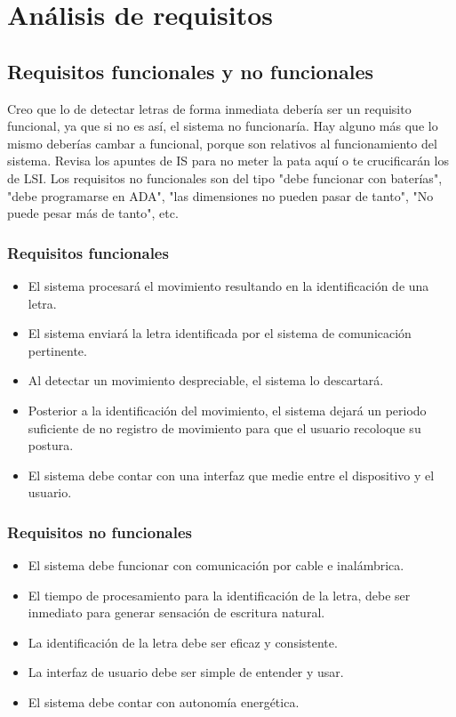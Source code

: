 \chapter{Análisis de requisitos}

\section{Requisitos funcionales y no funcionales}
{\color{red}Creo que lo de detectar letras de forma inmediata debería
ser un requisito funcional, ya que si no es así, el sistema no
funcionaría. Hay alguno más que lo mismo deberías cambar a
funcional, porque son relativos al funcionamiento del sistema. Revisa
los apuntes de IS para no meter la pata aquí o te crucificarán los
de LSI. Los requisitos no funcionales son del tipo "debe funcionar con
baterías", "debe programarse en ADA", "las dimensiones no pueden
pasar de tanto", "No puede pesar más de tanto", etc.}
\subsection{Requisitos funcionales}
\begin{itemize}
    \itemsep0em 
    \item El sistema procesará el movimiento resultando en la
    identificación de una letra.
    \item El sistema enviará la letra identificada por el sistema
    de comunicación pertinente.
    \item Al detectar un movimiento despreciable, el sistema lo descartará.
    \item Posterior a la identificación del movimiento, el sistema
    dejará un periodo suficiente de no registro de movimiento para
    que el usuario recoloque su postura.
    \item El sistema debe contar con una interfaz que medie entre
    el dispositivo y el usuario.
\end{itemize}


\subsection{Requisitos no funcionales}
\begin{itemize}
    \itemsep0em 
    \item El sistema debe funcionar con comunicación por cable e inalámbrica.
    \item El tiempo de procesamiento para la identificación de la letra,
    debe ser inmediato para generar sensación de escritura natural.
    \item La identificación de la letra debe ser eficaz y consistente.
    \item La interfaz de usuario debe ser simple de entender y usar.
    \item El sistema debe contar con autonomía energética.
\end{itemize}


